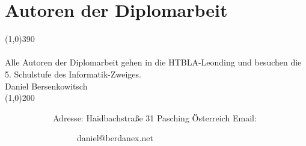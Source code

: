 \documentclass[FIPLY_base.tex]{subfiles}
\begin{document}
	\section{Autoren der Diplomarbeit}
	\line(1,0){390}
	\ \\
	\ \\
	Alle Autoren der Diplomarbeit gehen in die HTBLA-Leonding und besuchen die 5. Schulstufe des Informatik-Zweiges.
	\ \\
	\newline\newline
	{\Large Daniel Bersenkowitsch}
	\ \\
	\line(1,0){200}
	\begin{figure}[H]
		\begin{subfigure}[b]{0.3\textwidth}
			Adresse: \newline
			Haidbachstraße 31  Pasching \newline
			Österreich \newline
			\newline
			Email:
			\begin{subfigure}[b]{0.2\textwidth}
				daniel@berdanex.net
			\end{subfigure}
			\newline
			\newline
			\newline
			\newline
			\newline
		\end{subfigure}
		\hfil
		\begin{subfigure}[b]{0.2\textwidth}

\end{subfigure}
\end{figure}
\end{document}
